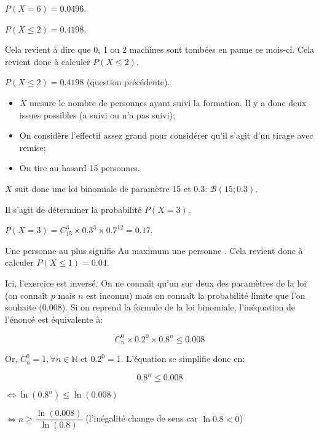 \documentclass[a4paper,12pt]{scrartcl}
\begin{document}
\question{}
$P(X=6) = 0.0496$.

\question{}
$P(X \leqslant 2) = 0.4198$.

\question{}
Cela revient à dire que 0, 1 ou 2 machines sont tombées en panne ce mois-ci. Cela revient donc à calculer $P(X \leqslant 2)$.

$P(X \leqslant 2) = 0.4198$ (question précédente).

\exo{}

\question{}

\begin{itemize}
    \item $X$ mesure le nombre de personnes ayant suivi la formation. Il y a donc deux issues possibles (a suivi ou n'a pas suivi);
    \item On considère l'effectif assez grand pour considérer qu'il s'agit d'un tirage avec remise;
    \item On tire au hasard 15 personnes.
\end{itemize}

$X$ suit donc une loi binomiale de paramètre 15 et 0.3: $\mathcal{B}(15;0.3)$.

\question{}
Il s'agit de déterminer la probabilité $P(X=3)$.

$P(X=3) = C_{15}^3 \times 0.3^3 \times 0.7^{12} = 0.17$.

\question{}
\og{}Une personne au plus \fg{} signifie \og{}Au maximum une personne \fg{}. Cela revient donc à calculer $P(X \leqslant 1) = 0.04$.

Ici, l'exercice est inversé. On ne connaît qu'un sur deux des paramètres de la loi (on connaît $p$ mais $n$ est inconnu) mais on connaît la probabilité limite que l'on souhaite (0.008). Si on reprend la formule de la loi binomiale, l'inéquation de l'énoncé est équivalente à:

\begin{equation*}
 C_n^0 \times 0.2^0 \times 0.8^n \leqslant 0.008
\end{equation*}

Or, $C_n^0 = 1, \forall n \in \mathbb{N}$ et $0.2^0 = 1$. L'équation se simplifie donc en:

\begin{equation*}
 0.8^n \leqslant 0.008
\end{equation*}

$\Leftrightarrow \ln(0.8^n) \leqslant \ln(0.008)$

$\Leftrightarrow n \geqslant \dfrac{\ln(0.008)}{\ln(0.8)}$ (l'inégalité change de sens car $\ln 0.8 < 0$)
\end{document}
